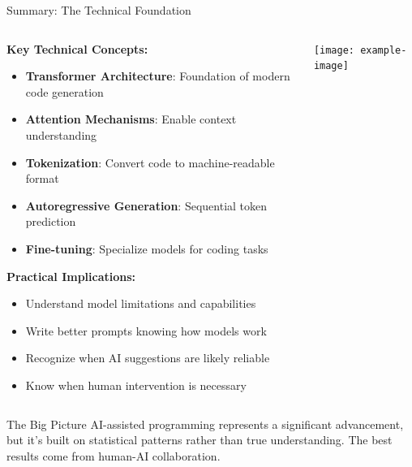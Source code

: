 \documentclass{beamer}
\begin{document}
\begin{frame}[t]{Summary: The Technical Foundation}
    \begin{columns}[t]
        \begin{column}{0.6\textwidth}
            \textbf{Key Technical Concepts:}
            \begin{itemize}
                \item \textbf{Transformer Architecture}: Foundation of modern code generation
                \item \textbf{Attention Mechanisms}: Enable context understanding
                \item \textbf{Tokenization}: Convert code to machine-readable format
                \item \textbf{Autoregressive Generation}: Sequential token prediction
                \item \textbf{Fine-tuning}: Specialize models for coding tasks
            \end{itemize}
            
            \textbf{Practical Implications:}
            \begin{itemize}
                \item Understand model limitations and capabilities
                \item Write better prompts knowing how models work
                \item Recognize when AI suggestions are likely reliable
                \item Know when human intervention is necessary
            \end{itemize}
        \end{column}
        \begin{column}{0.4\textwidth}
            \centering
            \texttt{[image: example-image]} %
        \end{column}
    \end{columns}
    
    \vspace{0.3cm}
    \begin{block}{The Big Picture}
        AI-assisted programming represents a significant advancement, but it's built on statistical patterns rather than true understanding. The best results come from human-AI collaboration.
    \end{block}
\end{frame}
\end{document}

